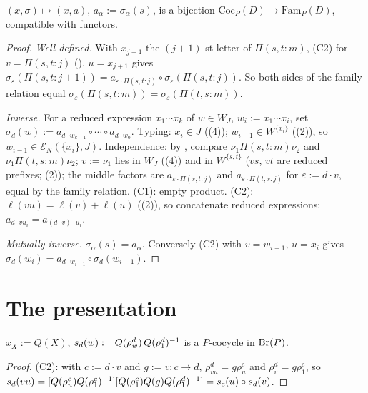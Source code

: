 \documentclass[11pt]{article}
\newcommand{\EN}{\mathcal{E}_N}
\newcommand{\Coc}{\mathrm{Coc}}
\newcommand{\Fam}{\mathrm{Fam}}
\newcommand{\altw}[3]{\Pi(#1,#2:#3)}
\begin{document}
\begin{theorem}\label{thm:matsumoto}
  $(x,\sigma) \mapsto (x,a)$, $a_\alpha := \sigma_\alpha(s)$, is a bijection $\Coc_P(D) \to
  \Fam_P(D)$, compatible with functors.
\end{theorem}
\begin{proof}
  \emph{Well defined.} With $x_{j+1}$ the $(j+1)$-st letter of $\altw stm$, (C2) for $v = \altw stj$
  (), $u = x_{j+1}$ gives $\sigma_\varepsilon(\altw st{j+1}) =
  a_{\varepsilon\cdot\altw stj} \circ \sigma_\varepsilon(\altw stj)$. So both sides of the family
  relation equal $\sigma_\varepsilon(\altw stm) = \sigma_\varepsilon(\altw tsm)$.

  \emph{Inverse.} For a reduced expression $x_1\cdots x_k$ of $w \in W_J$, $w_i := x_1\cdots x_i$, set
  $\sigma_d(w) := a_{d\cdot w_{k-1}} \circ \cdots \circ a_{d\cdot w_0}$. Typing: $x_i \in J$
  ((4)); $w_{i-1} \in W^{\{x_i\}}$ ((2)), so $w_{i-1} \in
  \EN(\{x_i\},J)$. Independence: by , compare $\nu_1\altw stm\nu_2$ and $\nu_1\altw
  tsm\nu_2$; $v := \nu_1$ lies in $W_J$ ((4)) and in $W^{\{s,t\}}$ ($vs$, $vt$ are
  reduced prefixes; (2)); the middle factors are $a_{\varepsilon\cdot\altw
  stj}$ and $a_{\varepsilon\cdot\altw tsj}$ for $\varepsilon := d\cdot v$, equal by the family
  relation. (C1): empty product. (C2): $\ell(vu) = \ell(v) + \ell(u)$ ((2)), so
  concatenate reduced expressions; $a_{d\cdot vu_i} = a_{(d\cdot v)\cdot u_i}$.

  \emph{Mutually inverse.} $\sigma_\alpha(s) = a_\alpha$. Conversely (C2) with $v = w_{i-1}$, $u = x_i$
  gives $\sigma_d(w_i) = a_{d\cdot w_{i-1}} \circ \sigma_d(w_{i-1})$.
\end{proof}

\section{The presentation}

\begin{lemma}\label{lem:s}
  $x_X := Q(X)$, $s_d(w) := Q(\rho^d_w)\,Q(\rho^d_1)^{-1}$ is a $P$-cocycle in $\operatorname{Br}(P)$.
\end{lemma}
\begin{proof}
  (C2): with $c := d\cdot v$ and $g := v : c \to d$, $\rho^d_{vu} = g\rho^c_u$ and $\rho^d_v =
  g\rho^c_1$, so $s_d(vu) = [Q(\rho^c_u)Q(\rho^c_1)^{-1}][Q(\rho^c_1)Q(g)Q(\rho^d_1)^{-1}] = s_c(u)
  \circ s_d(v)$.
\end{proof}
\end{document}

